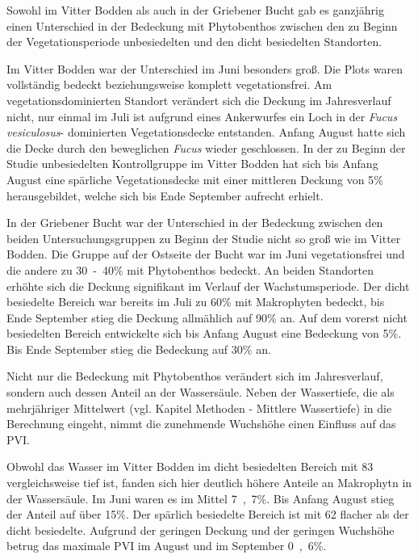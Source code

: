 Sowohl im Vitter Bodden als auch in der Griebener Bucht gab es ganzjährig einen Unterschied in der Bedeckung mit Phytobenthos zwischen den zu Beginn der Vegetationsperiode unbesiedelten und den dicht besiedelten Standorten.

Im Vitter Bodden war der Unterschied im Juni besonders groß. Die Plots waren vollständig bedeckt beziehungsweise komplett vegetationsfrei. Am vegetationsdominierten Standort verändert sich die Deckung im Jahresverlauf nicht, nur einmal im Juli ist aufgrund eines Ankerwurfes ein Loch in der \textit{Fucus vesiculosus}- dominierten Vegetationsdecke entstanden. Anfang August hatte sich die Decke durch den beweglichen \textit{Fucus} wieder geschlossen.
In der zu Beginn der Studie unbesiedelten Kontrollgruppe im Vitter Bodden hat sich bis Anfang August eine spärliche Vegetationsdecke mit einer mittleren Deckung von \unit{5}{\%} herausgebildet, welche sich bis Ende September aufrecht erhielt.

In der Griebener Bucht war der Unterschied in der Bedeckung zwischen den beiden Untersuchungsgruppen zu Beginn der Studie nicht so groß wie im Vitter Bodden. Die Gruppe auf der Ostseite der Bucht war im Juni vegetationsfrei und die andere zu \unit{30-40}{\%} mit Phytobenthos bedeckt. An beiden Standorten erhöhte sich die Deckung signifikant im Verlauf der Wachstumsperiode. Der dicht besiedelte Bereich war bereits im Juli zu \unit{60}{\%} mit Makrophyten bedeckt, bis Ende September stieg die Deckung allmählich auf \unit{90}{\%} an. Auf dem vorerst nicht besiedelten Bereich entwickelte sich bis Anfang August eine Bedeckung von \unit{5}{\%}. Bis Ende September stieg die Bedeckung auf \unit{30}{\%} an.

Nicht nur die Bedeckung mit Phytobenthos verändert sich im Jahresverlauf, sondern auch dessen Anteil an der Wassersäule. Neben der Wassertiefe, die als mehrjähriger Mittelwert (vgl. Kapitel  Methoden - Mittlere Wassertiefe) in die Berechnung eingeht, nimmt die zunehmende Wuchshöhe einen Einfluss auf das PVI.

Obwohl das Wasser im Vitter Bodden im dicht besiedelten Bereich mit \unit{83}{\centi\metre} vergleichsweise tief ist, fanden sich hier deutlich höhere Anteile an Makrophytn in der Wassersäule. Im Juni waren es im Mittel \unit{7,7}{\%}. Bis Anfang August stieg der Anteil auf über \unit{15}{\%}. Der spärlich besiedelte Bereich ist mit \unit{62}{\centi\metre} flacher als der dicht besiedelte. Aufgrund der geringen Deckung und der geringen Wuchshöhe betrug das maximale PVI im August und im September \unit{0,6}{\%}. 

